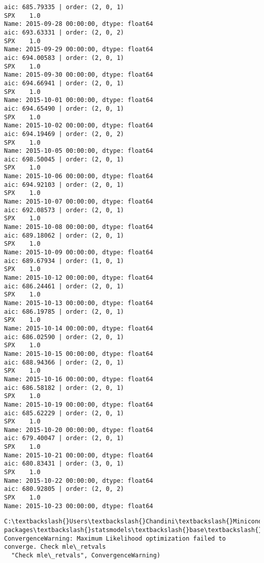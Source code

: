 \documentclass[11pt]{article}
\begin{document}
    \begin{Verbatim}[commandchars=\\\{\}]
aic: 685.79335 | order: (2, 0, 1)
SPX    1.0
Name: 2015-09-28 00:00:00, dtype: float64
aic: 693.63331 | order: (2, 0, 2)
SPX    1.0
Name: 2015-09-29 00:00:00, dtype: float64
aic: 694.00583 | order: (2, 0, 1)
SPX    1.0
Name: 2015-09-30 00:00:00, dtype: float64
aic: 694.66941 | order: (2, 0, 1)
SPX    1.0
Name: 2015-10-01 00:00:00, dtype: float64
aic: 694.65490 | order: (2, 0, 1)
SPX    1.0
Name: 2015-10-02 00:00:00, dtype: float64
aic: 694.19469 | order: (2, 0, 2)
SPX    1.0
Name: 2015-10-05 00:00:00, dtype: float64
aic: 698.50045 | order: (2, 0, 1)
SPX    1.0
Name: 2015-10-06 00:00:00, dtype: float64
aic: 694.92103 | order: (2, 0, 1)
SPX    1.0
Name: 2015-10-07 00:00:00, dtype: float64
aic: 692.08573 | order: (2, 0, 1)
SPX    1.0
Name: 2015-10-08 00:00:00, dtype: float64
aic: 689.18062 | order: (2, 0, 1)
SPX    1.0
Name: 2015-10-09 00:00:00, dtype: float64
aic: 689.67934 | order: (1, 0, 1)
SPX    1.0
Name: 2015-10-12 00:00:00, dtype: float64
aic: 686.24461 | order: (2, 0, 1)
SPX    1.0
Name: 2015-10-13 00:00:00, dtype: float64
aic: 686.19785 | order: (2, 0, 1)
SPX    1.0
Name: 2015-10-14 00:00:00, dtype: float64
aic: 686.02590 | order: (2, 0, 1)
SPX    1.0
Name: 2015-10-15 00:00:00, dtype: float64
aic: 688.94366 | order: (2, 0, 1)
SPX    1.0
Name: 2015-10-16 00:00:00, dtype: float64
aic: 686.58182 | order: (2, 0, 1)
SPX    1.0
Name: 2015-10-19 00:00:00, dtype: float64
aic: 685.62229 | order: (2, 0, 1)
SPX    1.0
Name: 2015-10-20 00:00:00, dtype: float64
aic: 679.40047 | order: (2, 0, 1)
SPX    1.0
Name: 2015-10-21 00:00:00, dtype: float64
aic: 680.83431 | order: (3, 0, 1)
SPX    1.0
Name: 2015-10-22 00:00:00, dtype: float64
aic: 680.92805 | order: (2, 0, 2)
SPX    1.0
Name: 2015-10-23 00:00:00, dtype: float64

    \end{Verbatim}

    \begin{Verbatim}[commandchars=\\\{\}]
C:\textbackslash{}Users\textbackslash{}Chandini\textbackslash{}Miniconda3\textbackslash{}envs\textbackslash{}auquan\textbackslash{}lib\textbackslash{}site-packages\textbackslash{}statsmodels\textbackslash{}base\textbackslash{}model.py:496: ConvergenceWarning: Maximum Likelihood optimization failed to converge. Check mle\_retvals
  "Check mle\_retvals", ConvergenceWarning)

    \end{Verbatim}
\end{document}
